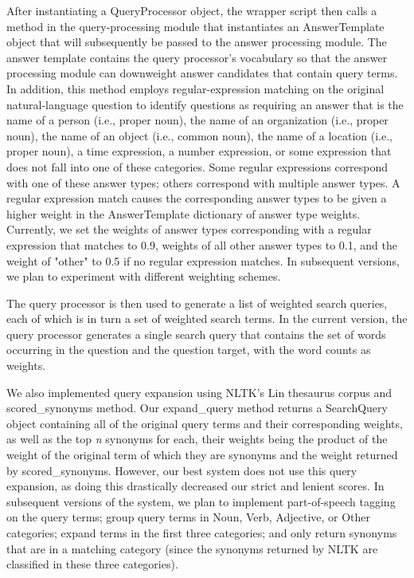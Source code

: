 \documentclass[11pt]{article}
\begin{document}
After instantiating a QueryProcessor object, the wrapper script then calls a method in the query-processing module that instantiates an AnswerTemplate object that will subsequently be passed to the answer processing module. The answer template contains the query processor's vocabulary so that the answer processing module can downweight answer candidates that contain query terms. In addition, this method employs regular-expression matching on the original natural-language question to identify questions as requiring an answer that is the name of a person (i.e., proper noun), the name of an organization (i.e., proper noun), the name of an object (i.e., common noun), the name of a location (i.e., proper noun), a time expression, a number expression, or some expression that does not fall into one of these categories. Some regular expressions correspond with one of these answer types; others correspond with multiple answer types. A regular expression match causes the corresponding answer types to be given a higher weight in the AnswerTemplate dictionary of answer type weights. Currently, we set the weights of answer types corresponding with a regular expression that matches to 0.9, weights of all other answer types to 0.1, and the weight of "other" to 0.5 if no regular expression matches. In subsequent versions, we plan to experiment with different weighting schemes.

The query processor is then used to generate a list of weighted search queries, each of which is in turn a set of weighted search terms. In the current version, the query processor generates a single search query that contains the set of words occurring in the question and the question target, with the word counts as weights.

We also implemented query expansion using NLTK's Lin thesaurus corpus and scored\_synonyms method. Our expand\_query method returns a SearchQuery object containing all of the original query terms and their corresponding weights, as well as the top \emph{n} synonyms for each, their weights being the product of the weight of the original term of which they are synonyms and the weight returned by scored\_synonyms. However, our best system does not use this query expansion, as doing this drastically decreased our strict and lenient scores. In subsequent versions of the system, we plan to implement part-of-speech tagging on the query terms; group query terms in Noun, Verb, Adjective, or Other categories; expand terms in the first three categories; and only return synonyms that are in a matching category (since the synonyms returned by NLTK are classified in these three categories).
\end{document}
